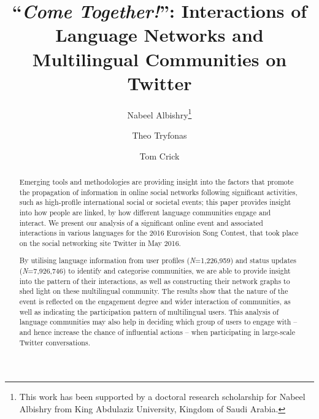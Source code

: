 \documentclass{llncs}
\begin{document}
\title{``{\emph{Come Together!}}'': Interactions of Language Networks and Multilingual Communities on Twitter}

\author{Nabeel Albishry\thanks{This work has been supported by a doctoral research scholarship for
Nabeel Albishry from King Abdulaziz University, Kingdom of Saudi
Arabia.} \and Theo Tryfonas \and Tom
  Crick}



\maketitle

\begin{abstract}
Emerging tools and methodologies are providing insight into the
factors that promote the propagation of information in online social
networks following significant activities, such as high-profile
international social or societal events; this paper provides insight
into how people are linked, by how different language communities
engage and interact. We present our analysis of a significant online
event and associated interactions in various languages for the 2016
Eurovision Song Contest, that took place on the social networking site
Twitter in May 2016.

By utilising language information from user profiles
({\emph{N}}=1,226,959) and status updates ({\emph{N}}=7,926,746) to
identify and categorise communities, we are able to provide insight
into the pattern of their interactions, as well as constructing their
network graphs to shed light on these multilingual community. The
results show that the nature of the event is reflected on the
engagement degree and wider interaction of communities, as well as
indicating the participation pattern of multilingual users. This
analysis of language communities may also help in deciding which group
of users to engage with -- and hence increase the chance of
influential actions -- when participating in large-scale Twitter
conversations.
\end{abstract}
\end{document}
